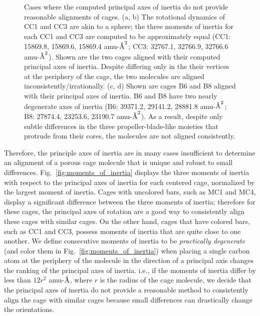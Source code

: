 \documentclass[journal=jacsat,manuscript=article]{achemso}
\newcommand{\angstrom}{\mbox{\normalfont\AA}}
\begin{document}
{\begin{figure}
\centering
	 \qquad
	\caption{{\color{red} Cases where the computed principal axes of inertia do not provide reasonable alignments of cages. (a, b) The rotational dynamics of CC1 and CC3 are akin to a sphere; the three moments of inertia for each CC1 and CC3 are computed to be approximately equal (CC1: 15869.8, 15869.6, 15869.4 amu-$\angstrom^2$; CC3: 32767.1, 32766.9, 32766.6 amu-$\angstrom^2$). Shown are the two cages aligned with their computed principal axes of inertia. Despite differing only in the their vertices at the periphery of the cage, the two molecules are aligned inconsistently/irrationally. (c, d) Shown are cages B6 and B8 aligned with their principal axes of inertia. B6 and B8 have two nearly degenerate axes of inertia (B6: 39371.2, 29141.2, 28881.8 amu-$\angstrom^2$; B8: 27874.4, 23253.6, 23190.7 amu-$\angstrom^2$). As a result, despite only subtle differences in the three propeller-blade-like moieties that protrude from their cores, the molecules are not aligned consistently.
	}%
	} \label{fig:misaligned}
\end{figure}

Therefore, the principle axes of inertia are in many cases insufficient to determine an alignment of a porous cage molecule that is unique and robust to small differences. Fig.~\ref{fig:moments_of_inertia} displays the three moments of inertia with respect to the principal axes of inertia for each centered cage, normalized by the largest moment of inertia. Cages with uncolored bars, such as MC1 and MC4, display a significant difference between the three moments of inertia; therefore for these cages, the  principal axes of rotation are a good way to consistently align these cages with similar cages. On the other hand, cages that have colored bars, such as CC1 and CC3, possess moments of inertia that are quite close to one another. We define consecutive moments of inertia to be \emph{practically degenerate} (and color them in Fig.~\ref{fig:moments_of_inertia}) when placing a single carbon atom at the periphery of the molecule in the direction of a principal axis changes the ranking of the principal axes of inertia. i.e., if the moments of inertia differ by less than $12 r^2$ amu-$\angstrom$, where $r$ is the radius of the cage molecule, we decide that the principal axes of inertia do not provide a reasonable method to consistently align the cage with similar cages because small differences can drastically change the orientations.

}
\end{document}
